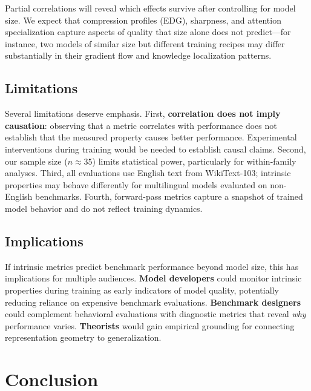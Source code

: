 \documentclass{article}
\begin{document}
Partial correlations will reveal which effects survive after controlling for model size.
We expect that compression profiles (EDG), sharpness, and attention specialization capture aspects of quality that size alone does not predict---for instance, two models of similar size but different training recipes may differ substantially in their gradient flow and knowledge localization patterns.

\subsection{Limitations}

Several limitations deserve emphasis.
First, \textbf{correlation does not imply causation}: observing that a metric correlates with performance does not establish that the measured property causes better performance.
Experimental interventions during training would be needed to establish causal claims.
Second, our sample size ($n \approx 35$) limits statistical power, particularly for within-family analyses.
Third, all evaluations use English text from WikiText-103; intrinsic properties may behave differently for multilingual models evaluated on non-English benchmarks.
Fourth, forward-pass metrics capture a snapshot of trained model behavior and do not reflect training dynamics.

\subsection{Implications}

If intrinsic metrics predict benchmark performance beyond model size, this has implications for multiple audiences.
\textbf{Model developers} could monitor intrinsic properties during training as early indicators of model quality, potentially reducing reliance on expensive benchmark evaluations.
\textbf{Benchmark designers} could complement behavioral evaluations with diagnostic metrics that reveal \emph{why} performance varies.
\textbf{Theorists} would gain empirical grounding for connecting representation geometry to generalization.

\section{Conclusion}
\label{sec:conclusion}
\end{document}
